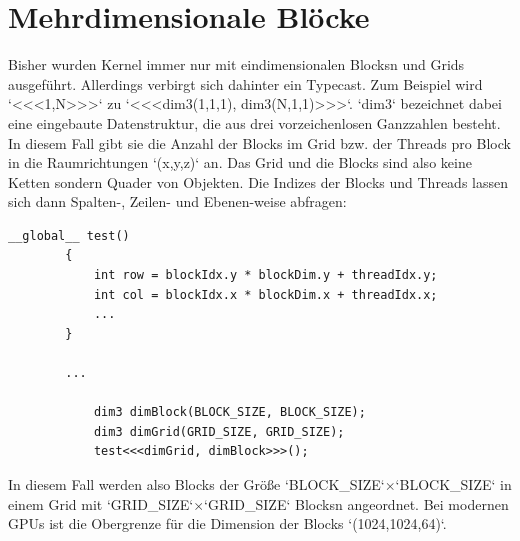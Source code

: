 		\newpage
		
		\section{Mehrdimensionale Bl\"ocke}
		Bisher wurden \Gls{Kernel} immer nur mit eindimensionalen \Glspl{Block}n und \Glspl{Grid} ausgeführt. Allerdings verbirgt sich dahinter ein Typecast. Zum Beispiel wird \li`<<<1,N>>>` zu \li`<<<dim3(1,1,1), dim3(N,1,1)>>>`. \li`dim3` bezeichnet dabei eine eingebaute Datenstruktur, die aus drei vorzeichenlosen Ganzzahlen besteht. In diesem Fall gibt sie die Anzahl der \Glspl{Block} im \Gls{Grid} bzw. der \Glspl{Thread} pro \Gls{Block} in die Raumrichtungen \li`(x,y,z)` an. Das \Gls{Grid} und die \Glspl{Block} sind also keine Ketten sondern Quader von Objekten. Die Indizes der \Glspl{Block} und \Glspl{Thread} lassen sich dann Spalten-, Zeilen- und Ebenen-weise abfragen: 			
        \begin{lstlisting}[caption=Multidimensionale Blöcke]
        __global__ test()
        {
            int row = blockIdx.y * blockDim.y + threadIdx.y;
            int col = blockIdx.x * blockDim.x + threadIdx.x;
            ...
        }
        
        ...
        
            dim3 dimBlock(BLOCK_SIZE, BLOCK_SIZE);
            dim3 dimGrid(GRID_SIZE, GRID_SIZE);
            test<<<dimGrid, dimBlock>>>();
        \end{lstlisting}
        In diesem Fall werden also \Glspl{Block} der Größe \li`BLOCK_SIZE`$\times$\li`BLOCK_SIZE` in einem \Gls{Grid} mit \li`GRID_SIZE`$\times$\li`GRID_SIZE` \Glspl{Block}n angeordnet. Bei modernen GPUs ist die Obergrenze für die Dimension der \Glspl{Block} \li`(1024,1024,64)`.
        

